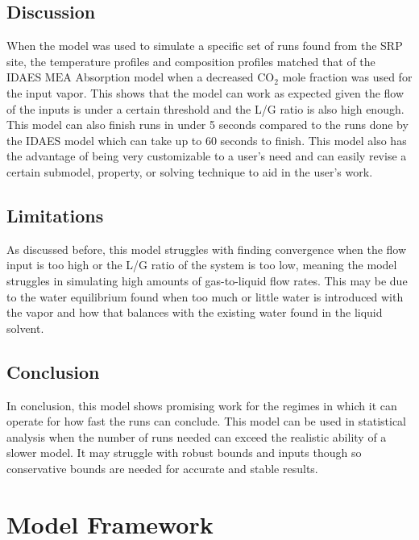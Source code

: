 \documentclass[12pt, letterpaper]{article}
\begin{document}
        \subsection{Discussion}\label{subsec:discussion}
            When the model was used to simulate a specific set of runs found from the SRP site, the temperature profiles and composition profiles matched that of the IDAES $\mathrm{MEA}$ Absorption model when a decreased $\mathrm{CO}_2$ mole fraction was used for the input vapor.
            This shows that the model can work as expected given the flow of the inputs is under a certain threshold and the L/G ratio is also high enough.
            This model can also finish runs in under 5 seconds compared to the runs done by the IDAES model which can take up to 60 seconds to finish.
            This model also has the advantage of being very customizable to a user's need and can easily revise a certain submodel, property, or solving technique to aid in the user's work.
    
        \subsection{Limitations}\label{subsec:limitations}
            As discussed before, this model struggles with finding convergence when the flow input is too high or the L/G ratio of the system is too low, meaning the model struggles in simulating high amounts of gas-to-liquid flow rates.
            This may be due to the water equilibrium found when too much or little water is introduced with the vapor and how that balances with the existing water found in the liquid solvent.
    
        \subsection{Conclusion}\label{subsec:conclusion}
            In conclusion, this model shows promising work for the regimes in which it can operate for how fast the runs can conclude.
            This model can be used in statistical analysis when the number of runs needed can exceed the realistic ability of a slower model.
            It may struggle with robust bounds and inputs though so conservative bounds are needed for accurate and stable results.
    
    \section{Model Framework}\label{sec:model-framework}
        
\end{document}
